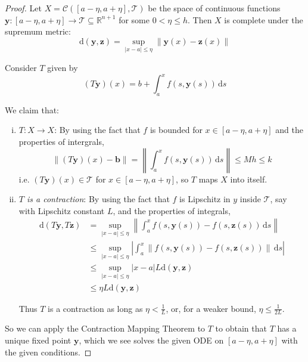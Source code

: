 \documentclass[10pt,fleqn]{article}
\newcommand{\diff}{\,\mathrm{d}}
\newcommand{\met}{\mathrm{d}}
\newcommand{\reals}{\mathbb{R}}
\newcommand{\vc}[1]{\boldsymbol{#1}}
\theoremstyle{definition} \newtheorem{defn}{Definition}[section]
\theoremstyle{plain}      \newtheorem{thm}[defn]{Theorem}
\theoremstyle{plain}      \newtheorem{lem}[defn]{Lemma}
\theoremstyle{definition} \newtheorem{prop}[defn]{Proposition}
\theoremstyle{definition} \newtheorem{cor}[defn]{Corollary}
\theoremstyle{definition} \newtheorem{ex}[defn]{Example}
\theoremstyle{definition} \newtheorem{rem}[defn]{Remark}
\begin{document}
\begin{proof}
    Let $X=\mathcal{C}([a-\eta,a+\eta],\mathcal{T})$ be the space of continuous functions\\ $\vc{y}:[a-\eta,a+\eta]\to\mathcal{T}\subseteq\reals^{n+1}$ for some $0<\eta\leq h$.
    Then $X$ is complete under the supremum metric:
    \[
        \met(\vc{y},\vc{z})=
        \sup_{|x-a|\leq\eta}\|\vc{y}(x)-\vc{z}(x)\|
    \]

    Consider $T$ given by
    \[
        (T\vc{y})(x)=
        b+\int_a^x f(s,\vc{y}(s))\diff s
    \]

    We claim that:

    \begin{enumerate}[(i)]
        \item \emph{$T:X\to X$}:
        By using the fact that $f$ is bounded for $x\in[a-\eta,a+\eta]$ and the properties of intergrals,
        \[
            \|(T\vc{y})(x)-\vc{b}\|=
            \left\|\int_a^x f(s,\vc{y}(s))\diff s\right\|\leq
            Mh\leq
            k
        \]
        i.e. $(T\vc{y})(x)\in\mathcal{T}$ for $x\in[a-\eta,a+\eta]$, so $T$ maps $X$ into itself.
        \item \emph{$T$ is a contraction}:
        By using the fact that $f$ is Lipschitz in $y$ inside $\mathcal{T}$, say with Lipschitz constant $L$, and the properties of integrals,
        \begin{align*}
            \met(T\vc{y},T\vc{z})
            &=
            \sup_{|x-a|\leq \eta}\left\|\int_a^x f(s,\vc{y}(s))-f(s,\vc{z}(s))\diff s\right\|\\
            &\leq
            \sup_{|x-a|\leq \eta}\left|\int_a^x \|f(s,\vc{y}(s))-f(s,\vc{z}(s))\|\diff s\right|\\
            &\leq
            \sup_{|x-a|\leq \eta}|x-a|L\met(\vc{y},\vc{z})\\
            &\leq
            \eta L\met(\vc{y},\vc{z})
        \end{align*}

        Thus $T$ is a contraction as long as $\eta<\frac{1}{L}$, or, for a weaker bound, $\eta\leq\frac{1}{2L}$.
    \end{enumerate}

    So we can apply the Contraction Mapping Theorem to $T$ to obtain that $T$ has a unique fixed point $\vc{y}$, which we see solves the given ODE on $[a-\eta,a+\eta]$ with the given conditions.


\end{proof}
\end{document}
